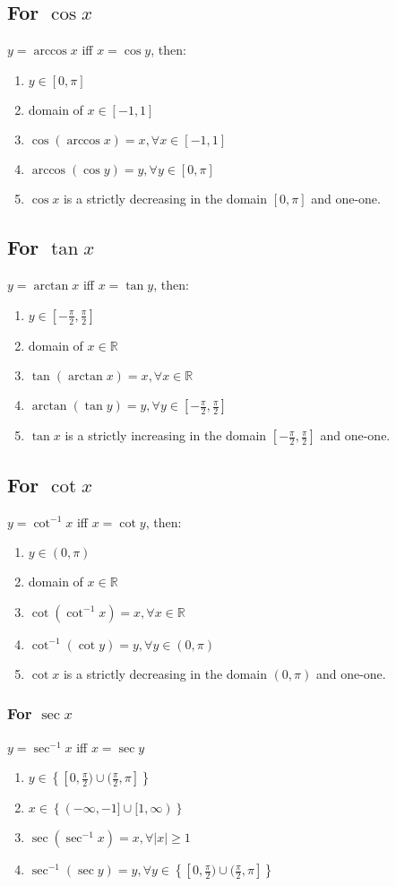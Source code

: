 \documentclass[openany, oneside]{book}
\begin{document}
\subsection{For $\cos x$}
$y=\arccos x$ iff $x=\cos y$, then:
\begin{enumerate}
\item $y \in [0,\pi]$
\item domain of $x \in [-1,1]$
\item $\cos(\arccos x)=x,\forall x\in[-1,1]$
\item $\arccos(\cos y)=y, \forall y\in [0,\pi]$
\item $\cos x$ is a strictly decreasing in the domain $[0,\pi]$ and one-one.
\end{enumerate}

\subsection{For $\tan x$}
$y=\arctan x$ iff $x=\tan y$, then:
\begin{enumerate}
\item $y \in [-\frac{\pi}{2},\frac{\pi}{2}]$
\item domain of $x \in \mathbb{R}$
\item $\tan(\arctan x)=x,\forall x\in\mathbb{R}$
\item $\arctan(\tan y)=y, \forall y\in [-\frac{\pi}{2},\frac{\pi}{2}]$
\item $\tan x$ is a strictly increasing in the domain $[-\frac{\pi}{2},\frac{\pi}{2}]$ and one-one.
\end{enumerate}

\subsection{For $\cot x$}
$y=\cot^{-1} x$ iff $x=\cot y$, then:
\begin{enumerate}
\item $y \in (0,\pi)$
\item domain of $x \in \mathbb{R}$
\item $\cot(\cot^{-1} x)=x,\forall x\in\mathbb{R}$
\item $\cot^{-1}(\cot y)=y, \forall y\in (0,\pi)$
\item $\cot x$ is a strictly decreasing in the domain $(0,\pi)$ and one-one.
\end{enumerate}

\subsubsection{For $\sec x$}
$y=\sec^{-1} x$ iff $x=\sec y$
\begin{enumerate}
\item $y\in\left\lbrace [0,\frac{\pi}{2})\cup(\frac{\pi}{2},\pi]\right\rbrace$
\item $x\in\left\lbrace(-\infty,-1]\cup[1,\infty)\right\rbrace$
\item $\sec(\sec^{-1}x)=x,\forall \lvert x \rvert \geq 1$
\item $\sec^{-1}(\sec y)=y, \forall y \in \left\lbrace [0,\frac{\pi}{2})\cup(\frac{\pi}{2},\pi]\right\rbrace$
\end{enumerate}
\end{document}
